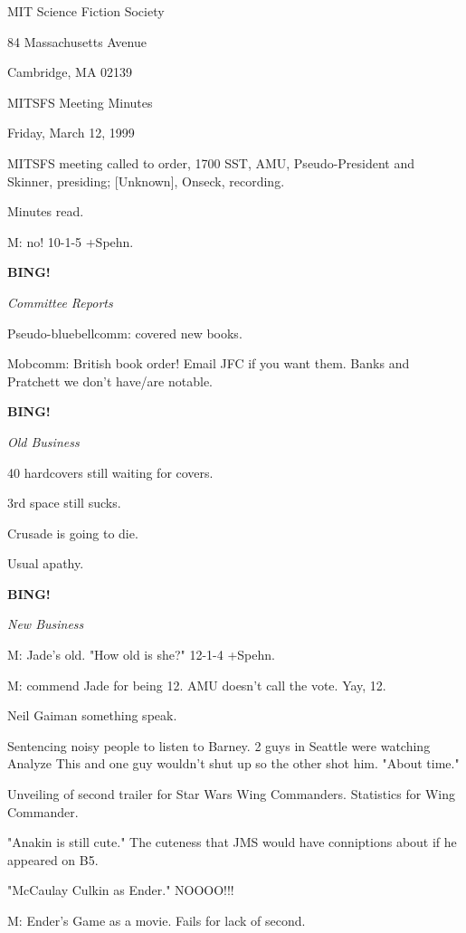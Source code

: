\documentclass[12pt]{article}
\newcommand{\bing}{{\bf BING!} }
\newcommand{\goto}[1]{\bing \vskip 12pt \centerline{{\em{#1}}}}
\begin{document}
\begin{center}

MIT Science Fiction Society 

84 Massachusetts Avenue

Cambridge, MA 02139

\vspace{12pt}

MITSFS Meeting Minutes 

Friday, March 12, 1999

\end{center}
 
\vspace{18pt}

\setlength{\parskip}{6pt}

\noindent
MITSFS meeting called to order, 1700 SST,
AMU, Pseudo-President and Skinner, presiding; [Unknown], Onseck, recording.

Minutes read.

M: no! 10-1-5 +Spehn.

\goto{Committee Reports}

Pseudo-bluebellcomm: covered new books.

Mobcomm: British book order! Email JFC if you want them. Banks and Pratchett we don't have/are notable.

\goto{Old Business}

40 hardcovers still waiting for covers.

3rd space still sucks.

Crusade is going to die.

Usual apathy.

\goto{New Business}

M: Jade's old. "How old is she?" 12-1-4 +Spehn.

M: commend Jade for being 12. AMU doesn't call the vote. Yay, 12.

Neil Gaiman something speak.

Sentencing noisy people to listen to Barney. 2 guys in Seattle were watching Analyze This and one guy wouldn't shut up so the other shot him. "About time."

Unveiling of second trailer for Star Wars Wing Commanders. Statistics for Wing Commander.

"Anakin is still cute." The cuteness that JMS would have conniptions about if he appeared on B5.

"McCaulay Culkin as Ender." NOOOO!!!

M: Ender's Game as a movie. Fails for lack of second.
\end{document}
